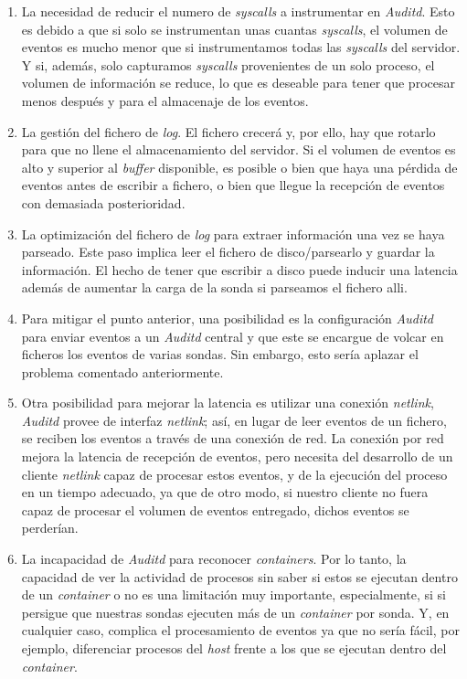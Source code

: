 \begin{enumerate}
    \item La necesidad de reducir el numero de \emph{syscalls} a instrumentar en \emph{Auditd}. Esto es debido a que si solo se instrumentan unas cuantas \emph{syscalls}, el volumen de eventos es mucho menor que si
    instrumentamos todas las \emph{syscalls} del servidor. Y si, además, solo capturamos \emph{syscalls} provenientes de un solo proceso, el volumen de información se reduce, lo que es 
    deseable para tener que procesar menos después y para el almacenaje de los eventos.
    \item La gestión del fichero de \emph{log}. El fichero crecerá y, por ello, hay que rotarlo para que no llene el almacenamiento del servidor. Si el volumen de eventos es alto y superior 
    al \emph{buffer} disponible, es posible o bien que haya una pérdida de eventos antes de escribir a fichero, o bien que llegue la recepción de eventos con demasiada posterioridad.
    \item La optimización del fichero de \emph{log} para extraer información una vez se haya parseado. Este paso implica leer el fichero de disco/parsearlo y guardar la información. El hecho de tener que escribir a disco puede inducir una latencia además de aumentar la carga de la sonda si parseamos el fichero alli.
    \item Para mitigar el punto anterior, una posibilidad es la configuración  \emph{Auditd} para enviar eventos a un \emph{Auditd} central y que este se encargue de volcar en ficheros los eventos de varias sondas. Sin embargo, esto sería aplazar el problema
    comentado anteriormente.
    \item Otra posibilidad para mejorar la latencia es utilizar una conexión \emph{netlink},
    \emph{Auditd} provee de interfaz \emph{netlink}; así, en lugar de leer eventos de un fichero, 
    se reciben los eventos a través de una conexión de red. 
    La conexión por red mejora la latencia de recepción de eventos, 
    pero necesita del desarrollo de un cliente \emph{netlink} capaz de procesar estos eventos, 
    y de la ejecución del proceso en un tiempo adecuado, ya que de otro modo, 
    si nuestro cliente no fuera capaz de procesar el volumen de eventos entregado,
    dichos eventos se perderían.
    \item La incapacidad de \emph{Auditd} para reconocer \emph{containers}. Por lo tanto, la capacidad de ver la actividad de procesos
    sin saber si estos se ejecutan dentro de un \emph{container} o no es una limitación muy importante, especialmente, si si persigue que nuestras sondas
    ejecuten más de un \emph{container} por sonda. Y, en cualquier caso, complica el procesamiento de eventos ya que no sería fácil, por ejemplo, diferenciar procesos
    del \emph{host} frente a los que se ejecutan dentro del \emph{container}.
\end{enumerate}

